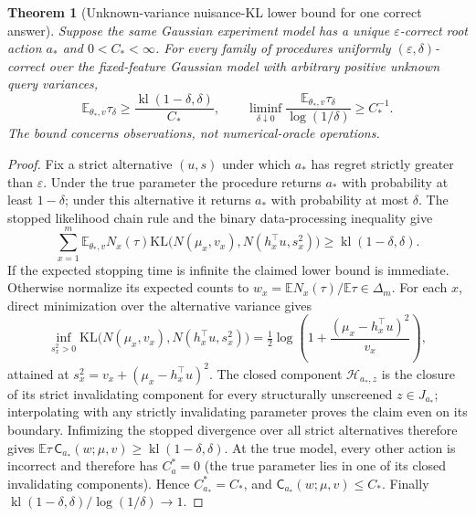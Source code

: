 \documentclass{article}
\theoremstyle{plain}
\newtheorem{theorem}{Theorem}[section]
\theoremstyle{definition}
\begin{document}
\begin{theorem}[Unknown-variance nuisance-KL lower bound for one correct answer]
\label{thm:v34-converse}
Suppose the same Gaussian experiment model has a unique
$\varepsilon$-correct root action $a_*$ and
$0<C_*<\infty$. For every family of procedures uniformly
$(\varepsilon,\delta)$-correct over the fixed-feature Gaussian model
with arbitrary positive unknown query variances,
\begin{equation}
 \mathbb E_{\theta_*,v}\tau_\delta\ge
 \frac{\operatorname{kl}(1-\delta,\delta)}{C_*},
 \qquad
 \liminf_{\delta\downarrow0}
 \frac{\mathbb E_{\theta_*,v}\tau_\delta}{\log(1/\delta)}
 \ge C_*^{-1}.
 \label{eq:v34-unique-converse}
\end{equation}
The bound concerns observations, not numerical-oracle operations.
\end{theorem}
\begin{proof}
Fix a strict alternative $(u,s)$ under which $a_*$ has regret
strictly greater than $\varepsilon$. Under the true parameter the
procedure returns $a_*$ with probability at least $1-\delta$;
under this alternative it returns $a_*$ with probability at most
$\delta$. The stopped likelihood chain rule and the binary
data-processing inequality give
\[
 \sum_{x=1}^m\mathbb E_{\theta_*,v}N_x(\tau)
  \mathrm{KL}\bigl(N(\mu_x,v_x),N(h_x^\top u,s_x^2)\bigr)
 \ge\operatorname{kl}(1-\delta,\delta).
\]
If the expected stopping time is infinite the claimed lower bound is
immediate. Otherwise normalize its expected counts to
$w_x=\mathbb E N_x(\tau)/\mathbb E\tau\in\Delta_m$.
For each $x$, direct minimization over the alternative variance gives
\[
 \inf_{s_x^2>0}\mathrm{KL}\bigl(N(\mu_x,v_x),N(h_x^\top u,s_x^2)\bigr)
 =\tfrac12\log\left(1+\frac{(\mu_x-h_x^\top u)^2}{v_x}\right),
\]
attained at $s_x^2=v_x+(\mu_x-h_x^\top u)^2$.
The closed component $\mathcal H_{a_*,z}$ is the closure of its strict
invalidating component for every structurally unscreened $z\in J_{a_*}$;
interpolating with any strictly invalidating parameter proves the
claim even on its boundary. Infimizing the stopped divergence over
all strict alternatives therefore gives
$\mathbb E\tau\,\mathsf C_{a_*}(w;\mu,v)
\ge\operatorname{kl}(1-\delta,\delta)$.
At the true model, every other action is incorrect and therefore has
$C_a^*=0$ (the true parameter lies in one of its closed invalidating
components). Hence $C_{a_*}^*=C_*$, and
$\mathsf C_{a_*}(w;\mu,v)\le C_*$.
Finally $\operatorname{kl}(1-\delta,\delta)/\log(1/\delta)\to1$.
\end{proof}
\end{document}
